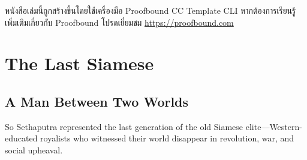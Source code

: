 \documentclass[
  Letterpaper,
]{scrbook}
\begin{document}
\begin{tcolorbox}[enhanced jigsaw, left=2mm, toprule=.15mm, title=\textcolor{quarto-callout-note-color}{\faInfo}\hspace{0.5em}{เกี่ยวกับหนังสือเล่มนี้}, breakable, leftrule=.75mm, bottomrule=.15mm, colback=white, rightrule=.15mm, colframe=quarto-callout-note-color-frame, toptitle=1mm, titlerule=0mm, colbacktitle=quarto-callout-note-color!10!white, coltitle=black, bottomtitle=1mm, opacitybacktitle=0.6, arc=.35mm, opacityback=0]

หนังสือเล่มนี้ถูกสร้างขึ้นโดยใช้เครื่องมือ Proofbound CC Template CLI
หากต้องการเรียนรู้เพิ่มเติมเกี่ยวกับ Proofbound โปรดเยี่ยมชม
\url{https://proofbound.com}

\end{tcolorbox}


\chapter{The Last Siamese}\label{sec-last-siamese}

\section{A Man Between Two Worlds}\label{a-man-between-two-worlds}

So Sethaputra represented the last generation of the old Siamese
elite---Western-educated royalists who witnessed their world disappear
in revolution, war, and social upheaval.
\end{document}
